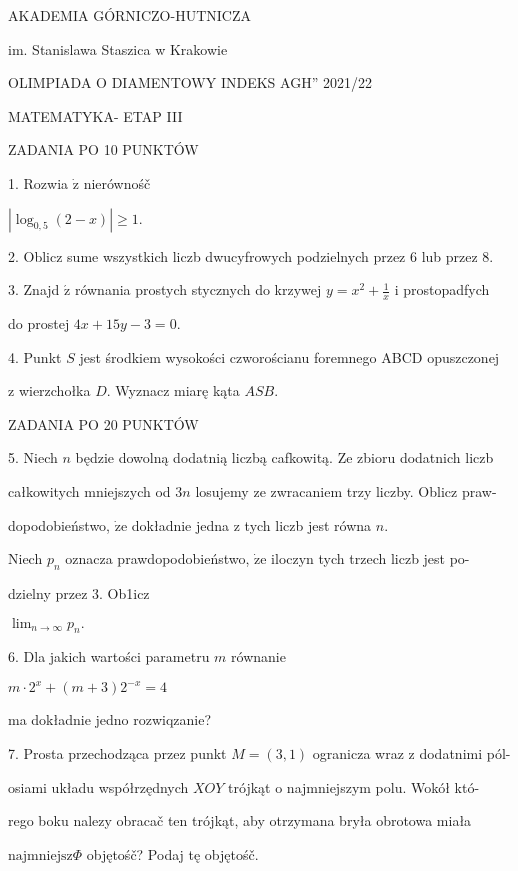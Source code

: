 \documentclass[a4paper,12pt]{article}
\begin{document}
AKADEMIA GÓRNICZO-HUTNICZA

im. Stanislawa Staszica w Krakowie

OLIMPIADA O DIAMENTOWY INDEKS AGH'' 2021/22

MATEMATYKA- ETAP III

ZADANIA PO 10 PUNKTÓW

1. Rozwia $\dot{\mathrm{z}}$ nierównośč

$|\log_{0,5}(2-x)|\geq 1.$

2. Oblicz sume wszystkich liczb dwucyfrowych podzielnych przez 6 lub przez 8.

3. Znajd $\acute{\mathrm{z}}$ równania prostych stycznych do krzywej $y=x^{2}+\displaystyle \frac{1}{x}$ i prostopadfych

do prostej $4x+15y-3=0.$

4. Punkt $S$ jest środkiem wysokości czworościanu foremnego ABCD opuszczonej

z wierzchołka $D$. Wyznacz miarę kąta $ASB.$

ZADANIA PO 20 PUNKTÓW

5. Niech $n$ będzie dowolną dodatnią liczbą cafkowitą. Ze zbioru dodatnich liczb

całkowitych mniejszych od $3n$ losujemy ze zwracaniem trzy liczby. Oblicz praw-

dopodobieństwo, $\dot{\mathrm{z}}\mathrm{e}$ dokładnie jedna z tych liczb jest równa $n.$

Niech $p_{n}$ oznacza prawdopodobieństwo, $\dot{\mathrm{z}}\mathrm{e}$ iloczyn tych trzech liczb jest po-

dzielny przez 3. Ob1icz

$\displaystyle \lim_{n\rightarrow\infty}p_{n}.$

6. Dla jakich wartości parametru $m$ równanie

$m\cdot 2^{x}+(m+3)2^{-x}=4$

ma dokładnie jedno rozwiqzanie?

7. Prosta przechodząca przez punkt $M=(3,1)$ ogranicza wraz z dodatnimi pól-

osiami układu współrzędnych $XOY$ trójkąt o najmniejszym polu. Wokół któ-

rego boku nalezy obracač ten trójkąt, aby otrzymana bryła obrotowa miała

$\mathrm{n}\mathrm{a}\mathrm{j}\mathrm{m}\mathrm{n}\mathrm{i}\mathrm{e}\mathrm{j}\mathrm{s}\mathrm{z}\Phi$ objętośč? Podaj tę objętośč.
\end{document}
